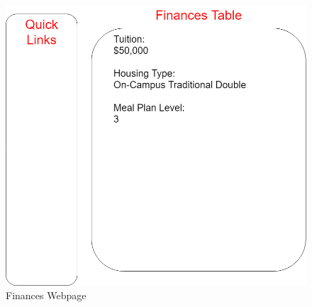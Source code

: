 \documentclass{article}
\begin{document}
      \begin{figure}[H]
        \centering
        \includegraphics[width=4 in]{Design/Finances}
        \caption{Finances Webpage}
        \label{fig:Finances}
      \end{figure}

    \newpage

\end{document}
